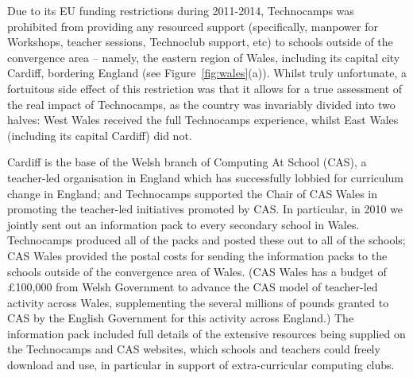 \documentclass{sig-alternate}
\begin{document}
Due to its EU funding restrictions during 2011-2014,
Technocamps was prohibited from providing any resourced support
(specifically, manpower for Workshops, teacher sessions,
Technoclub support, etc)
to schools outside of the convergence area -- namely,
the eastern region of Wales, including its capital city Cardiff,
bordering England
(see Figure~\ref{fig:wales}(a)).
Whilst truly unfortunate,
a fortuitous side effect of this restriction was that it allows for
a true assessment of the real impact of Technocamps,
as the country was invariably divided into two halves:
West Wales received the full Technocamps experience,
whilst East Wales (including its capital Cardiff) did not.

Cardiff is the base of the Welsh branch of Computing At School (CAS),
a teacher-led organisation in England which has successfully
lobbied for curriculum change in England; and
Technocamps supported the Chair of CAS Wales
in promoting
the teacher-led initiatives promoted by CAS.
In particular, in 2010 we jointly sent out an information pack
to every secondary school in Wales.
Technocamps produced all of the packs and
posted these out to all of the schools; CAS Wales provided
the postal costs for sending the information packs to the schools
outside of the convergence area of Wales.
(CAS Wales has a budget of \pounds100,000 from Welsh Government
to advance the CAS model of teacher-led activity across Wales,
supplementing the several millions of pounds granted
to CAS by the English Government for this activity across England.)
The information pack included full details of the extensive resources
being supplied on the Technocamps and CAS websites,
which schools and teachers could freely download and use,
in particular in support of extra-curricular computing clubs.
\end{document}
